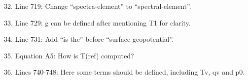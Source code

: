 \documentclass[12pt,oneside,a4paper]{article}%
\begin{document}
{\color{blue}{See response to general remarks.}} \newline

32. Line 719: Change “spectra-element” to “spectral-element”. \newline

{\color{blue}{Done.}} \newline

33. Line 729: g can be defined after mentioning T1 for clarity. \newline

{\color{blue}{Done.}} \newline

34. Line 731: Add “is the” before “surface geopotential”. \newline

{\color{blue}{Done.}} \newline

35. Equation A5: How is T(ref) computed? \newline

{\color{blue}{Defined in equation A1.}} \newline

36. Lines 740-748: Here some terms should be defined, including Tv, qv and p0. \newline

{\color{blue}{Added definitions for Tv and thetav. p0 is defined just below equation A3. I don't see a ``qv".}}

\end{document}
